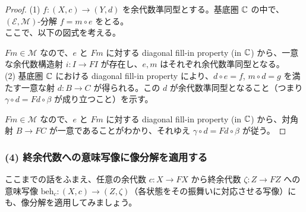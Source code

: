 \documentclass[
		head_space=20mm,
		foot_space=20mm,
		gutter=10mm,
		line_length=190mm
]{jlreq}
\begin{document}
\begin{proof}
	(1) $f:(X,c)\to(Y,d)$ を余代数準同型とする。基底圏 $\mathbb{C}$ の中で、$(\mathcal E,\mathcal M)$-分解 $f=m\circ e$ をとる。\\ ここで、以下の図式を考える。
	\begin{center}
	\end{center}
	$Fm\in\mathcal M$ なので、$e$ と $Fm$ に対する diagonal fill-in property (in $\mathbb{C}$) から、一意な余代数構造射 $i:I\to FI$ が存在し、$e,m$ はそれぞれ余代数準同型となる。\\ 
	(2) 基底圏 $\mathbb{C}$ における diagonal fill-in property により、$d\circ e=f$, $m\circ d=g$ を満たす一意な射 $d:B\to C$ が得られる。この $d$ が余代数準同型となること（つまり $\gamma\circ d=Fd\circ\beta$ が成り立つこと）を示す。
	\begin{center}
	\end{center}
	$Fm\in\mathcal M$ なので、$e$ と $Fm$ に対する diagonal fill-in property (in $\mathbb{C}$) から、対角射 $B\to FC$ が一意であることがわかり、それゆえ $\gamma\circ d=Fd\circ\beta$ が従う。
\end{proof}

\clearpage

\subsubsection*{(4) 終余代数への意味写像に像分解を適用する}

\noindent ここまでの話をふまえ、任意の余代数 $c:X\to FX$ から終余代数 $\zeta:Z\to FZ$ への意味写像 $\mathrm{beh}_c:(X,c)\to(Z,\zeta)$（各状態をその振舞いに対応させる写像）にも、像分解を適用してみましょう。
\end{document}
